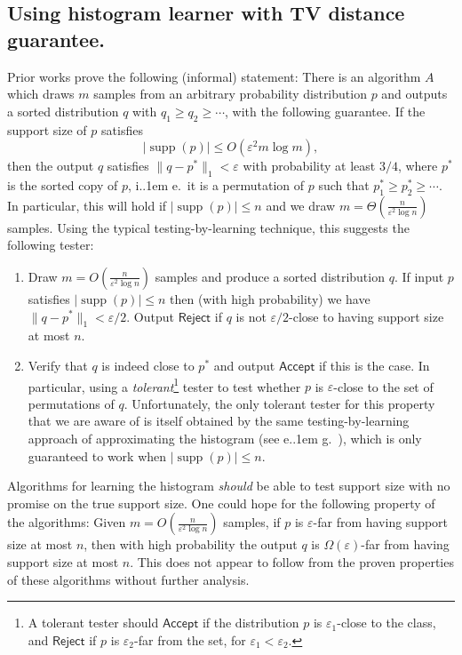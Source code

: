 \documentclass{theoretics}
\newcommand*\ie{i.\kern.1em e.\ }
\newcommand*\eg{e.\kern.1em g.\ }
\DeclareMathOperator{\supp}{supp}   %
\newcommand{\ACCEPT}{\mathsf{Accept}}
\newcommand{\REJECT}{\mathsf{Reject}}
\renewcommand{\epsilon}{\varepsilon}
\begin{document}
\subsection{Using histogram learner with TV distance guarantee.}
Prior works \cite{VV11stoc,VV17,HJW18} prove the following (informal) statement: There is an algorithm $A$
which draws $m$ samples from an arbitrary probability distribution $p$
and outputs a sorted distribution $q$ with $q_1 \geq q_2 \geq \dotsm$, with the following guarantee.  If
the support size of $p$ satisfies
\[
  |\supp(p)| \leq O\left( \epsilon^2 m \log m \right),
\]
then the output $q$ satisfies $\|q - p^* \|_1 < \epsilon$ with probability at least $3/4$, where
$p^*$ is the sorted copy of $p$, \ie it is a permutation of $p$ such that $p^*_1 \geq p^*_2 \geq
\dotsm$. In particular, this will hold if $|\supp(p)| \leq n$ and we draw $m = \Theta(
\tfrac{n}{\epsilon^2 \log n})$ samples. Using the typical testing-by-learning technique, this
suggests the following tester:
\begin{enumerate}
\item Draw $m = O( \tfrac{n}{\epsilon^2 \log n} )$ samples and produce a sorted distribution
$q$. If input $p$ satisfies $|\supp(p)| \leq n$ then (with high probability) we have
$\|q - p^*\|_1 < \epsilon/2$. Output $\REJECT$ if $q$ is not $\epsilon/2$-close to
having support size at most $n$.
\item Verify that $q$ is indeed close to $p^*$ and output $\ACCEPT$ if this is the case. In
particular, using a \emph{tolerant}\footnote{A tolerant tester should $\ACCEPT$ if the distribution
$p$ is $\epsilon_1$-close to the class, and $\REJECT$ if $p$ is $\epsilon_2$-far from the set, for
$\epsilon_1 < \epsilon_2$.} tester to test whether $p$ is $\epsilon$-close to the set of
permutations of $q$. Unfortunately, the only tolerant tester for
this property that we are aware of is itself obtained by the same testing-by-learning approach of
approximating the histogram (see \eg \cite{Gol17}), which is only guaranteed to work when
$|\supp(p)| \leq n$.
\end{enumerate}
Algorithms for learning the histogram \emph{should} be able to test support size with no
promise on the true support size. One could hope for the following property of the algorithms: Given
$m = O\left(\tfrac{n}{\epsilon^2 \log n}\right)$ samples, if $p$ is $\epsilon$-far from having
support size at most $n$, then with high probability the output $q$ is $\Omega(\epsilon)$-far from
having support size at most $n$. This does not appear to follow from the proven properties of these
algorithms without further analysis. 
\end{document}

